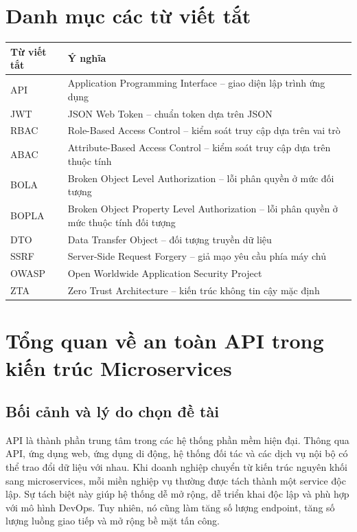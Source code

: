 \documentclass[14pt,a4paper]{extreport}
\begin{document}
\chapter*{Danh mục các từ viết tắt}
\begin{longtable}{p{3cm}p{11cm}}
\toprule
\textbf{Từ viết tắt} & \textbf{Ý nghĩa}\\
\midrule
API & Application Programming Interface -- giao diện lập trình ứng dụng\\
JWT & JSON Web Token -- chuẩn token dựa trên JSON\\
RBAC & Role-Based Access Control -- kiểm soát truy cập dựa trên vai trò\\
ABAC & Attribute-Based Access Control -- kiểm soát truy cập dựa trên thuộc tính\\
BOLA & Broken Object Level Authorization -- lỗi phân quyền ở mức đối tượng\\
BOPLA & Broken Object Property Level Authorization -- lỗi phân quyền ở mức thuộc tính đối tượng\\
DTO & Data Transfer Object -- đối tượng truyền dữ liệu\\
SSRF & Server-Side Request Forgery -- giả mạo yêu cầu phía máy chủ\\
OWASP & Open Worldwide Application Security Project\\
ZTA & Zero Trust Architecture -- kiến trúc không tin cậy mặc định\\
\bottomrule
\end{longtable}
\newpage


\chapter{Tổng quan về an toàn API trong kiến trúc Microservices}

\section{Bối cảnh và lý do chọn đề tài}
API là thành phần trung tâm trong các hệ thống phần mềm hiện đại. Thông qua API, ứng dụng web, ứng dụng di động, hệ thống đối tác và các dịch vụ nội bộ có thể trao đổi dữ liệu với nhau. Khi doanh nghiệp chuyển từ kiến trúc nguyên khối sang microservices, mỗi miền nghiệp vụ thường được tách thành một service độc lập. Sự tách biệt này giúp hệ thống dễ mở rộng, dễ triển khai độc lập và phù hợp với mô hình DevOps. Tuy nhiên, nó cũng làm tăng số lượng endpoint, tăng số lượng luồng giao tiếp và mở rộng bề mặt tấn công.
\end{document}
